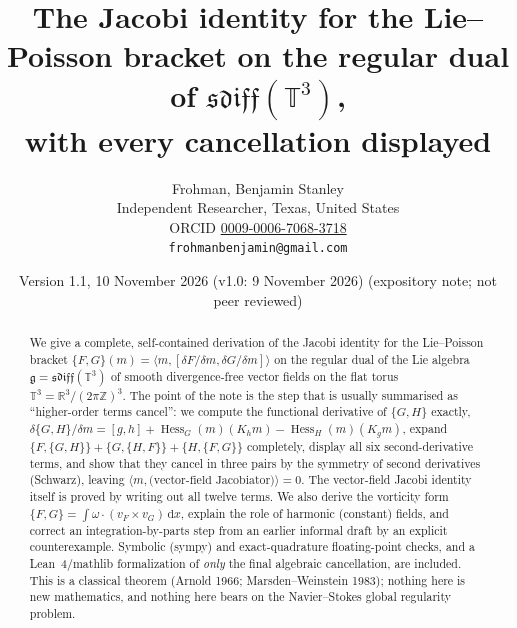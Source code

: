 \documentclass[11pt]{article}
\title{The Jacobi identity for the Lie--Poisson bracket on the regular dual of $\mathfrak{sdiff}(\mathbb{T}^3)$,\\ with every cancellation displayed}
\author{Frohman, Benjamin Stanley\\
Independent Researcher, Texas, United States\\
ORCID \href{https://orcid.org/0009-0006-7068-3718}{0009-0006-7068-3718}\\
\texttt{frohmanbenjamin@gmail.com}}
\date{Version 1.1, 10 November 2026 (v1.0: 9 November 2026) \quad (expository note; not peer reviewed)}
\theoremstyle{definition}
\newcommand{\T}{\mathbb{T}^3}
\newcommand{\R}{\mathbb{R}}
\newcommand{\Z}{\mathbb{Z}}
\newcommand{\g}{\mathfrak{g}}
\newcommand{\ip}[2]{\langle #1,#2\rangle}
\newcommand{\dd}{\,\mathrm{d}x}
\newcommand{\Hess}{\operatorname{Hess}}
\begin{document}
\maketitle
{}\par


\begin{abstract}
We give a complete, self-contained derivation of the Jacobi identity for the Lie--Poisson bracket
$\{F,G\}(m)=\ip{m}{[\delta F/\delta m,\delta G/\delta m]}$ on the regular dual of the Lie algebra
$\g=\mathfrak{sdiff}(\T)$ of smooth divergence-free vector fields on the flat torus
$\T=\R^3/(2\pi\Z)^3$. The point of the note is the step that is usually summarised as
``higher-order terms cancel'': we compute the functional derivative of $\{G,H\}$ exactly,
$\delta\{G,H\}/\delta m=[g,h]+\Hess_G(m)(K_hm)-\Hess_H(m)(K_gm)$, expand
$\{F,\{G,H\}\}+\{G,\{H,F\}\}+\{H,\{F,G\}\}$ completely, display all six second-derivative terms,
and show that they cancel in three pairs by the symmetry of second derivatives (Schwarz), leaving
$\ip{m}{\text{(vector-field Jacobiator)}}=0$. The vector-field Jacobi identity itself is proved by
writing out all twelve terms. We also derive the vorticity form
$\{F,G\}=\int\omega\cdot(v_F\times v_G)\dd$, explain the role of harmonic (constant) fields, and
correct an integration-by-parts step from an earlier informal draft by an explicit counterexample.
Symbolic (sympy) and exact-quadrature floating-point checks, and a Lean~4/mathlib formalization of
\emph{only} the final algebraic cancellation, are included. This is a classical theorem
(Arnold 1966; Marsden--Weinstein 1983); nothing here is new mathematics, and nothing here bears on
the Navier--Stokes global regularity problem.
\end{abstract}

\tableofcontents
\end{document}
